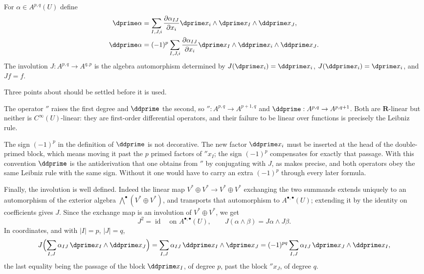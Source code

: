 \begin{definition}
\label{def:ch09-operators}
For $\alpha\in A^{p,q}(U)$ define
\[
\begin{aligned}
\dprime\alpha&=\sum_{I,J,i}\frac{\partial\alpha_{IJ}}{\partial x_i}
 \dprime x_i\wedge \dprime x_I\wedge \ddprime x_J,\\
\ddprime\alpha&=(-1)^p\sum_{I,J,i}\frac{\partial\alpha_{IJ}}{\partial x_i}
 \dprime x_I\wedge \ddprime x_i\wedge \ddprime x_J.
\end{aligned}
\]
The involution $J:A^{p,q}\to A^{q,p}$ is the algebra automorphism determined
by $J(\dprime x_i)=\ddprime x_i$, $J(\ddprime x_i)=\dprime x_i$, and $Jf=f$.
\end{definition}

Three points about  should be settled before it is
used.

The operator $\dprime$ raises the first degree and $\ddprime$ the second, so
$\dprime:A^{p,q}\to A^{p+1,q}$ and $\ddprime:A^{p,q}\to A^{p,q+1}$.  Both are
$\mathbf R$-linear but neither is $C^\infty(U)$-linear: they are first-order
differential operators, and their failure to be linear over functions is
precisely the Leibniz rule.

The sign $(-1)^p$ in the definition of $\ddprime$ is not decorative.  The new
factor $\ddprime x_i$ must be inserted at the head of the double-primed block,
which means moving it past the $p$ primed factors of $\dprime x_I$; the sign
$(-1)^p$ compensates for exactly that passage.  With this convention
$\ddprime$ is the antiderivation that one obtains from $\dprime$ by
conjugating with $J$, as  makes precise, and both
operators obey the same Leibniz rule with the same sign.  Without it one
would have to carry an extra $(-1)^p$ through every later formula.

Finally, the involution is well defined.  Indeed the linear map
$V^*\oplus V^*\to V^*\oplus V^*$ exchanging the two summands extends uniquely
to an automorphism of the exterior algebra $\bigwedge^\bullet(V^*\oplus V^*)$,
and  transports that automorphism to
$A^{\bullet,\bullet}(U)$; extending it by the identity on coefficients gives
$J$.  Since the exchange map is an involution of $V^*\oplus V^*$, we get
\[
 J^2=\operatorname{id}\quad\text{on }A^{\bullet,\bullet}(U),
 \qquad
 J(\alpha\wedge\beta)=J\alpha\wedge J\beta .
\]
In coordinates, and with $|I|=p$, $|J|=q$,
\begin{equation}
\label{eq:ch09-J-coordinates}
 J\Bigl(\sum_{I,J}\alpha_{IJ}\,\dprime x_I\wedge\ddprime x_J\Bigr)
 =\sum_{I,J}\alpha_{IJ}\,\ddprime x_I\wedge\dprime x_J
 =(-1)^{pq}\sum_{I,J}\alpha_{IJ}\,\dprime x_J\wedge\ddprime x_I ,
\end{equation}
the last equality being the passage of the block $\ddprime x_I$, of degree
$p$, past the block $\dprime x_J$, of degree $q$.

